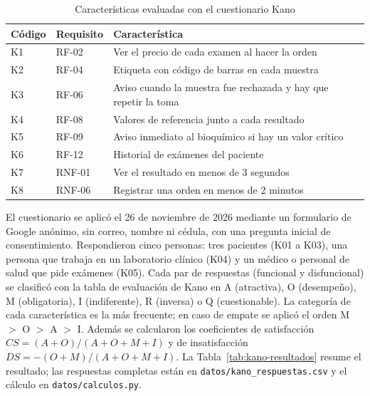 \documentclass[11pt,a4paper]{article}
\begin{document}
\begin{table}[htbp]
\centering
\caption{Características evaluadas con el cuestionario Kano}\label{tab:kano-caract}
\begin{tabular}{|l|l|L{9.5cm}|}
\hline
\textbf{Código} & \textbf{Requisito} & \textbf{Característica}\\
\hline
K1 & RF-02 & Ver el precio de cada examen al hacer la orden\\
\hline
K2 & RF-04 & Etiqueta con código de barras en cada muestra\\
\hline
K3 & RF-06 & Aviso cuando la muestra fue rechazada y hay que repetir la toma\\
\hline
K4 & RF-08 & Valores de referencia junto a cada resultado\\
\hline
K5 & RF-09 & Aviso inmediato al bioquímico si hay un valor crítico\\
\hline
K6 & RF-12 & Historial de exámenes del paciente\\
\hline
K7 & RNF-01 & Ver el resultado en menos de 3 segundos\\
\hline
K8 & RNF-06 & Registrar una orden en menos de 2 minutos\\
\hline
\end{tabular}
\end{table}

El cuestionario se aplicó el 26 de noviembre de 2026 mediante un formulario de Google anónimo, sin correo, nombre ni cédula, con una pregunta inicial de consentimiento. Respondieron cinco personas: tres pacientes (K01 a K03), una persona que trabaja en un laboratorio clínico (K04) y un médico o personal de salud que pide exámenes (K05). Cada par de respuestas (funcional y disfuncional) se clasificó con la tabla de evaluación de Kano en A (atractiva), O (desempeño), M (obligatoria), I (indiferente), R (inversa) o Q (cuestionable). La categoría de cada característica es la más frecuente; en caso de empate se aplicó el orden M $>$ O $>$ A $>$ I. Además se calcularon los coeficientes de satisfacción $CS = (A+O)/(A+O+M+I)$ y de insatisfacción $DS = -(O+M)/(A+O+M+I)$. La Tabla~\ref{tab:kano-resultados} resume el resultado; las respuestas completas están en \texttt{datos/kano\_respuestas.csv} y el cálculo en \texttt{datos/calculos.py}.
\end{document}
